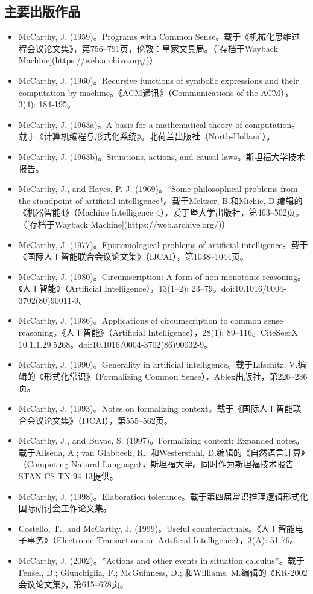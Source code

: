 \subsection{主要出版作品}
\begin{itemize}
\item McCarthy, J. (1959)。Programs with Common Sense。载于《机械化思维过程会议论文集》，第756–791页，伦敦：皇家文具局。（[存档于Wayback Machine](https://web.archive.org/)）
\item McCarthy, J. (1960)。Recursive functions of symbolic expressions and their computation by machine。《ACM通讯》（Communications of the ACM），3(4): 184-195。
\item McCarthy, J. (1963a)。A basis for a mathematical theory of computation。载于《计算机编程与形式化系统》。北荷兰出版社（North-Holland）。
\item McCarthy, J. (1963b)。Situations, actions, and causal laws。斯坦福大学技术报告。
\item McCarthy, J., and Hayes, P. J. (1969)。*Some philosophical problems from the standpoint of artificial intelligence*。载于Meltzer, B.和Michie, D.编辑的《机器智能4》（Machine Intelligence 4），爱丁堡大学出版社，第463–502页。（[存档于Wayback Machine](https://web.archive.org/)）
\item McCarthy, J. (1977)。Epistemological problems of artificial intelligence。载于《国际人工智能联合会议论文集》（IJCAI），第1038–1044页。
\item McCarthy, J. (1980)。Circumscription: A form of non-monotonic reasoning。《人工智能》（Artificial Intelligence），13(1–2): 23–79。doi:10.1016/0004-3702(80)90011-9。
\item McCarthy, J. (1986)。Applications of circumscription to common sense reasoning。《人工智能》（Artificial Intelligence），28(1): 89–116。CiteSeerX 10.1.1.29.5268。doi:10.1016/0004-3702(86)90032-9。
\item McCarthy, J. (1990)。Generality in artificial intelligence。载于Lifschitz, V.编辑的《形式化常识》（Formalizing Common Sense），Ablex出版社，第226–236页。
\item McCarthy, J. (1993)。Notes on formalizing context。载于《国际人工智能联合会议论文集》（IJCAI），第555–562页。
\item McCarthy, J., and Buvac, S. (1997)。Formalizing context: Expanded notes。载于Aliseda, A.; van Glabbeek, R.; 和Westerstahl, D.编辑的《自然语言计算》（Computing Natural Language），斯坦福大学。同时作为斯坦福技术报告STAN-CS-TN-94-13提供。
\item McCarthy, J. (1998)。Elaboration tolerance。载于第四届常识推理逻辑形式化国际研讨会工作论文集。
\item Costello, T., and McCarthy, J. (1999)。Useful counterfactuals。《人工智能电子事务》（Electronic Transactions on Artificial Intelligence），3(A): 51-76。
\item McCarthy, J. (2002)。*Actions and other events in situation calculus*。载于Fensel, D.; Giunchiglia, F.; McGuinness, D.; 和Williams, M.编辑的《KR-2002会议论文集》，第615–628页。
\end{itemize}
